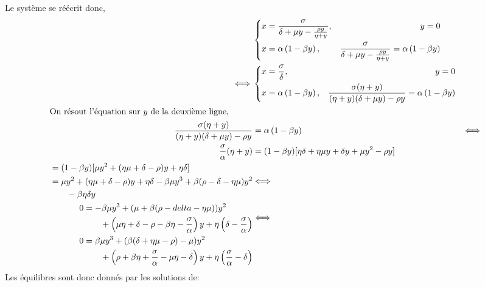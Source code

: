 \documentclass[12pt]{article}
\newcommand{\equ}{\Longleftrightarrow{}}
\begin{document}
Le système se réécrit donc, 
\begin{align*}
    &\left\{
    \begin{aligned}
        x &= \frac{\sigma}{\delta + \mu y- \frac{\rho y}{\eta+ y }},  &y= 0\\
        x&=\alpha \left(1-\beta y\right),  &\frac{\sigma}{\delta + \mu y - \frac{\rho y}{\eta+y}} = \alpha \left(1-\beta y\right)
    \end{aligned}\right.\\
    \equ &\left\{
    \begin{aligned}
        x &= \frac{\sigma}{\delta}, &y = 0\\
        x&=\alpha \left(1-\beta y\right),  &\frac{\sigma (\eta+y)}{(\eta+y)(\delta + \mu y) - \rho y} = \alpha \left(1-\beta y\right)
    \end{aligned}\right.\\
    \intertext{On résout l'équation sur $y$ de la deuxième ligne,}
    \frac{\sigma (\eta+y)}{(\eta+y)(\delta + \mu y) - \rho y} &= \alpha \left(1-\beta y\right) &\equ\\
   \frac{\sigma}{\alpha} (\eta + y) &= (1 - \beta y) [\eta \delta + \eta \mu y + \delta y +\mu y^2 -\rho y] \\
   \begin{split}
   &=(1-\beta y) [\mu y^2 + (\eta\mu + \delta-\rho)y + \eta\delta]\\
   &= \mu y^2 +(\eta\mu+\delta -\rho)y+\eta\delta - \beta\mu y^3 + \beta(\rho - \delta-\eta\mu)y^2\\
   & \qquad-\beta\eta\delta y \end{split} &\equ\\
\begin{split}
0 &= -\beta\mu y^3 + (\mu +\beta(\rho-delta-\eta\mu))y^2\\ &\qquad+\left(\mu\eta+\delta-\rho-\beta\eta-\frac{\sigma}{\alpha}\right)y + \eta \left(\delta-\frac{\sigma}{\alpha}\right) 
\end{split} &\equ\\
\begin{split}
0 &= \beta\mu y^3 + (\beta(\delta+\eta\mu-\rho)- \mu)y^2 \\ &\qquad+\left(\rho+\beta\eta+\frac{\sigma}{\alpha}- \mu\eta - \delta \right)y
+ \eta \left(\frac{\sigma}{\alpha} - \delta\right) 
\end{split} 
\end{align*}
Les équilibres sont donc donnés par les solutions de:
\end{document}
